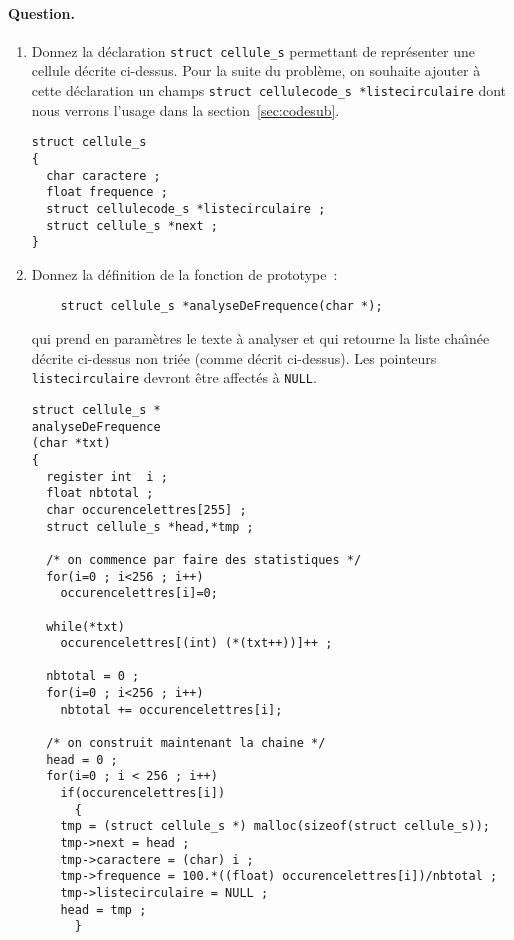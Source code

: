 \paragraph{Question.}
\begin{enumerate}
\item Donnez la d\'eclaration \verb+struct cellule_s+ permettant
  de repr\'esenter une cellule d\'ecrite ci-dessus. Pour la suite du
  probl\`eme, on souhaite ajouter \`a cette d\'eclaration un
  champs \verb+struct cellulecode_s *listecirculaire+ dont nous
  verrons l'usage dans la section~\ref{sec:codesub}.
\ifcorrection
  \begin{correction}
\begin{verbatim}
struct cellule_s
{
  char caractere ;
  float frequence ;
  struct cellulecode_s *listecirculaire ;
  struct cellule_s *next ;
}
\end{verbatim}
  \end{correction}
\fi
\item Donnez la d\'efinition de la fonction de prototype~:
\begin{verbatim}
    struct cellule_s *analyseDeFrequence(char *);
\end{verbatim}
  qui prend en param\`etres le texte \`a analyser et qui retourne la
  liste cha\^\i{}n\'ee d\'ecrite ci-dessus non tri\'ee (comme d\'ecrit
  ci-dessus). Les pointeurs \verb+listecirculaire+ devront \^etre
  affect\'es \`a \verb+NULL+.
\ifcorrection
  \begin{correction}
\begin{verbatim}
struct cellule_s *
analyseDeFrequence
(char *txt)
{
  register int  i ;
  float nbtotal ;
  char occurencelettres[255] ;
  struct cellule_s *head,*tmp ;

  /* on commence par faire des statistiques */
  for(i=0 ; i<256 ; i++)
    occurencelettres[i]=0;

  while(*txt)
    occurencelettres[(int) (*(txt++))]++ ;

  nbtotal = 0 ;
  for(i=0 ; i<256 ; i++)
    nbtotal += occurencelettres[i];

  /* on construit maintenant la chaine */
  head = 0 ;
  for(i=0 ; i < 256 ; i++)
    if(occurencelettres[i])
      {
	tmp = (struct cellule_s *) malloc(sizeof(struct cellule_s));
	tmp->next = head ;
	tmp->caractere = (char) i ;
	tmp->frequence = 100.*((float) occurencelettres[i])/nbtotal ;
	tmp->listecirculaire = NULL ;
	head = tmp ;
      }


\end{verbatim}
\end{correction}
\end{enumerate}
